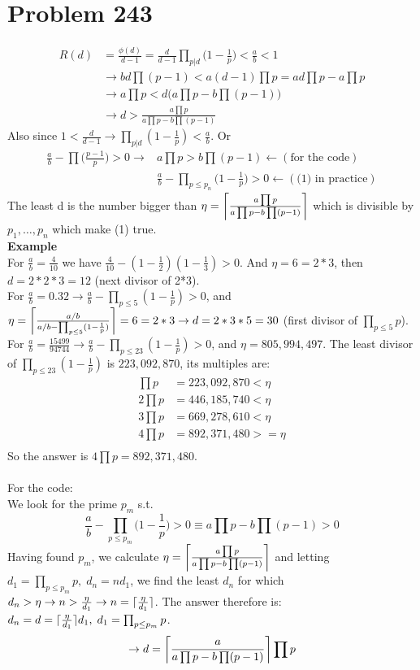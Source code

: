 \documentclass[12pt]{article}
\DeclarePairedDelimiter\ceil{\lceil}{\rceil}
\begin{document}
\section{Problem 243}
\begin{align*}
    R(d) &= \frac{\phi(d)}{d-1} = \frac{d}{d-1} \prod_{p|d} \bigg(1-\frac{1}{p}\bigg) < \frac{a}{b} < 1\\
    &\rightarrow bd \prod(p-1) < a(d-1) \prod p = ad\prod p - a\prod p \\
    &\rightarrow a\prod p < d\Big(a \prod p - b \prod(p-1)\Big) \\
    & \rightarrow d > \frac{a \prod p}{a \prod p - b\prod (p-1)}
\end{align*}
Also since $1 < \frac{d}{d-1} \rightarrow \prod_{p|d} (1 - \frac{1}{p}) < \frac{a}{b}$.
Or
\begin{align*}
    \frac{a}{b} - \prod \bigg(\frac{p-1}{p}\bigg) > 0 \rightarrow &a\prod p > b \prod (p-1) \leftarrow (\text{for the code}) \\
    & \frac{a}{b} - \prod_{p \leq p_n}\bigg(1 - \frac{1}{p}\bigg) > 0 \leftarrow (\text{(1) in practice})
\end{align*}
The least d is the number bigger than $\eta = \ceil*{\frac{a\prod p}{a\prod p - b\prod(p-1)}}$
which is divisible by $p_1, \ldots ,p_n$ which make (1) true.\\
\textbf{Example} \\For $\frac{a}{b} = \frac{4}{10}$ we have $\frac{4}{10} - (1-\frac{1}{2})(1-\frac{1}{3}) > 0$. And $\eta = 6 = 2*3$, then $d = 2*2*3= 12$ (next divisor of 2*3).\\
For $\frac{a}{b} = 0.32 \rightarrow \frac{a}{b} - \prod_{p \leq 5}(1-\frac{1}{p})>0$, and $\eta = \ceil*{\frac{a/b}{a/b-\prod_{p \leq 5}(1 - \frac{1}{p}) }} = 6 = 2*3\rightarrow d = 2*3*5 = 30$ (first divisor of $\prod_{p \leq 5}p$).
\\For $\frac{a}{b} = \frac{15499}{94744} \rightarrow \frac{a}{b} - \prod_{p \leq 23} (1- \frac{1}{p}) > 0$, and $\eta = 805,994,497$. The least divisor of $\prod_{p \leq 23}(1 - \frac{1}{p})$ is $223,092,870$, its multiples are:
\begin{align*}
    \prod p &= 223,092,870 < \eta \\
    2\prod p &= 446,185,740 < \eta \\
    3\prod p &= 669,278,610 < \eta \\
    4\prod p &= 892,371,480 >= \eta \\
\end{align*}
So the answer is $4\prod p = 892,371,480$.\\\\
For the code:\\
We look for the prime $p_m$ s.t.
$$
    \frac{a}{b} - \prod_{p \leq p_m}\bigg(1-\frac{1}{p}\bigg) > 0 \equiv a\prod p - b \prod(p-1) > 0
$$
Having found $p_m$, we calculate $\eta = \ceil*{\frac{a \prod p}{a \prod p - b\prod(p-1)}}$ and letting $d_1 = \prod_{p \leq p_m} p, \; d_n = nd_1$, we find the least $d_n$ for which $d_n > \eta \rightarrow n > \frac{\eta}{d_1} \rightarrow n = \ceil{\frac{\eta}{d_1}}$. The answer therefore is: $d_n = d = \ceil{\frac{\eta}{d_1}}d_1, \; d_1 = \prod_{p \leq p_m} p$.
$$
    \rightarrow d = \ceil*{\frac{a}{a\prod p - b \prod(p-1)}} \prod p
$$
\end{document}
